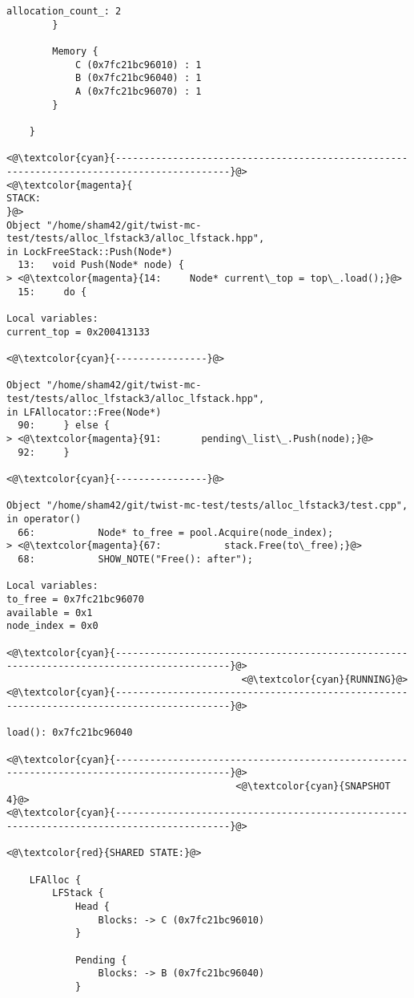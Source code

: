 \begin{adjustwidth}{-3.3cm}{-1cm}
\begin{allintypewriter}
\begin{multicols*}{2}
\begin{lstlisting}[numbers=none]
		    allocation_count_: 2
	    }

	    Memory {
		    C (0x7fc21bc96010) : 1
		    B (0x7fc21bc96040) : 1
		    A (0x7fc21bc96070) : 1
	    }

    }

<@\textcolor{cyan}{------------------------------------------------------------------------------------------}@>
<@\textcolor{magenta}{
STACK:
}@>
Object "/home/sham42/git/twist-mc-test/tests/alloc_lfstack3/alloc_lfstack.hpp",
in LockFreeStack::Push(Node*)
  13:   void Push(Node* node) {
> <@\textcolor{magenta}{14:     Node* current\_top = top\_.load();}@>
  15:     do {

Local variables: 
current_top = 0x200413133

<@\textcolor{cyan}{----------------}@>

Object "/home/sham42/git/twist-mc-test/tests/alloc_lfstack3/alloc_lfstack.hpp",
in LFAllocator::Free(Node*)
  90:     } else {
> <@\textcolor{magenta}{91:       pending\_list\_.Push(node);}@>
  92:     }

<@\textcolor{cyan}{----------------}@>

Object "/home/sham42/git/twist-mc-test/tests/alloc_lfstack3/test.cpp",
in operator()
  66:           Node* to_free = pool.Acquire(node_index);
> <@\textcolor{magenta}{67:           stack.Free(to\_free);}@>
  68:           SHOW_NOTE("Free(): after");

Local variables: 
to_free = 0x7fc21bc96070
available = 0x1
node_index = 0x0

<@\textcolor{cyan}{------------------------------------------------------------------------------------------}@>
                                         <@\textcolor{cyan}{RUNNING}@>
<@\textcolor{cyan}{------------------------------------------------------------------------------------------}@>

load(): 0x7fc21bc96040

<@\textcolor{cyan}{------------------------------------------------------------------------------------------}@>
                                        <@\textcolor{cyan}{SNAPSHOT 4}@>
<@\textcolor{cyan}{------------------------------------------------------------------------------------------}@>

<@\textcolor{red}{SHARED STATE:}@>

    LFAlloc {
	    LFStack {
		    Head {
			    Blocks: -> C (0x7fc21bc96010) 
		    }

		    Pending {
			    Blocks: -> B (0x7fc21bc96040) 
		    }


\end{lstlisting}
\end{multicols*}
\end{allintypewriter}
\end{adjustwidth}
